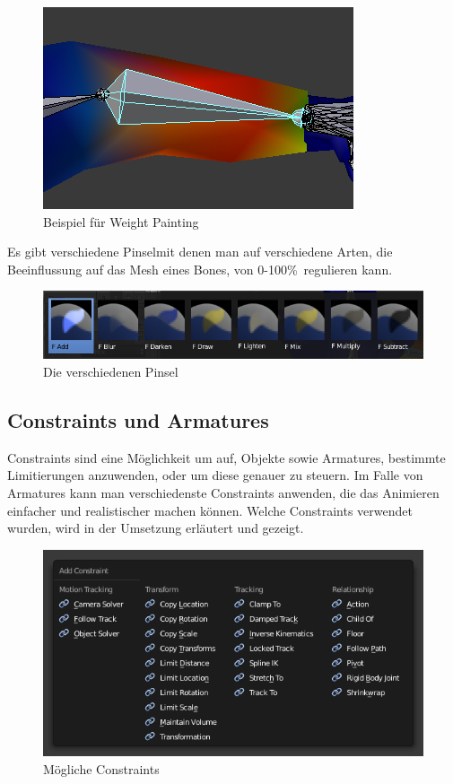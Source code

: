 \begin{figure}[H]
    \centering

    \includegraphics[width=.8\textwidth]{images/rigging_weight_painting_example.PNG}
    \caption{Beispiel für Weight Painting}
\end{figure}

Es gibt verschiedene \dq Pinsel\dq mit denen man auf verschiedene Arten, die Beeinflussung auf das Mesh eines Bones, von 0-100\%\ regulieren kann.

\begin{figure}[H]
    \centering

    \includegraphics[width=.8\textwidth]{images/rigging_weight_painting_tools.PNG}
    \caption{Die verschiedenen Pinsel}
\end{figure}

\subsection{Constraints und Armatures}
Constraints sind eine Möglichkeit um auf, Objekte sowie Armatures, bestimmte Limitierungen anzuwenden,
oder um diese genauer zu steuern. Im Falle von Armatures kann man verschiedenste Constraints anwenden, die das Animieren einfacher und realistischer machen können.
Welche Constraints verwendet wurden, wird in der Umsetzung erläutert und gezeigt.

\begin{figure}[H]
    \centering

    \includegraphics[width=.8\textwidth]{images/rigging_constraints_menu.png}
    \caption{Mögliche Constraints}
\end{figure}


